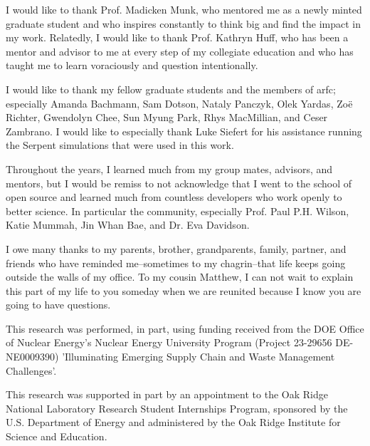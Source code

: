 I would like to thank Prof. Madicken Munk, who mentored me as a newly minted
graduate student and who inspires constantly to think big and find the impact
in my work. Relatedly, I would like to thank Prof. Kathryn Huff, who has been a
mentor and advisor to me at every step of my collegiate education and who has
taught me to learn voraciously and question intentionally.

I would like to thank my fellow graduate students and the members of
\gls{arfc}; especially Amanda Bachmann, Sam Dotson, Nataly Panczyk, Olek Yardas,
Zo\"{e} Richter, Gwendolyn Chee, Sun Myung Park, Rhys MacMillian,
and Ceser Zambrano. I would like to especially thank Luke Siefert for his
assistance running the Serpent simulations that were used in this work.

Throughout the years, I learned much from my group mates, advisors, and
mentors, but I would be remiss to not acknowledge that I went to the school of
open source and learned much from countless developers who work openly to
better science. In particular the \cyclus community, especially Prof. Paul P.H.
Wilson, Katie Mummah, Jin Whan Bae, and Dr. Eva Davidson.

I owe many thanks to my parents, brother, grandparents, family, partner, and
friends who have reminded me--sometimes to my chagrin--that life keeps going
outside the walls of my office. To my cousin Matthew, I can not wait to explain
this part of my life to you someday when we are reunited because I know you are
going to have questions.

This research was performed, in part, using funding received from the DOE
Office of Nuclear Energy's Nuclear Energy University Program (Project 23-29656
DE-NE0009390) 'Illuminating Emerging Supply Chain and Waste Management
Challenges'.

This research was supported in part by an appointment to the Oak Ridge National
Laboratory Research Student Internships Program, sponsored by the U.S.
Department of Energy and administered by the Oak Ridge Institute for Science
and Education.